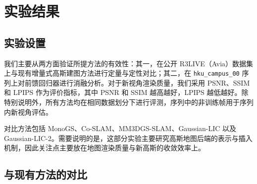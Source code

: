 
\section{实验结果}

\subsection{实验设置}
我们主要从两方面验证所提方法的有效性：其一，在公开 R3LIVE（Avia）数据集上与现有增量式高斯建图方法进行定量与定性对比；其二，在 \texttt{hku\_campus\_00} 序列上对前馈回归器进行消融分析。对于新视角渲染质量，我们采用 PSNR、SSIM 和 LPIPS 作为评价指标，其中 PSNR 和 SSIM 越高越好，LPIPS 越低越好。除特别说明外，所有方法均在相同数据划分下进行评测，序列中的非训练帧用于序列内新视角评估。

对比方法包括 MonoGS、Co-SLAM、MM3DGS-SLAM、Gaussian-LIC 以及 Gaussian-LIC-2。需要说明的是，这部分实验主要研究高斯地图后端的表示与插入机制，因此关注点主要放在地图渲染质量与新高斯的收敛效率上。

\subsection{与现有方法的对比}

